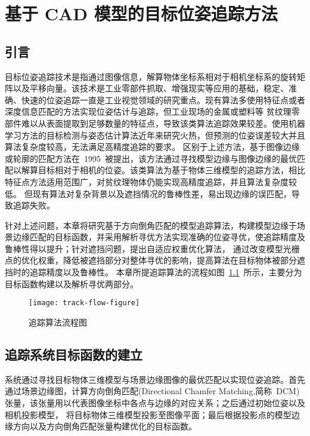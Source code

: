 \chapter{基于 CAD 模型的目标位姿追踪方法}
\label{cha:model_based_tracking}
\section{引言}
\label{sec:chapter3_intro}
目标位姿追踪技术是指通过图像信息，解算物体坐标系相对于相机坐标系的旋转矩阵以及平移向量。该技术是工业零部件抓取、增强现实等应用的基础，稳定、准确、快速的位姿追踪一直是工业视觉领域的研究重点。现有算法多使用特征点或者深度信息匹配的方法实现位姿估计与追踪，但工业现场的金属或塑料等
贫纹理零部件难以从表面提取到足够数量的特征点，导致该类算法追踪效果较差。使用机器学习方法的目标检测与姿态估计算法近年来研究火热，但预测的位姿误差较大并且算法复杂度较高，无法满足高精度追踪的要求。
区别于上述方法，基于图像边缘或轮廓的匹配方法在~1995~被提出，该方法通过寻找模型边缘与图像边缘的最优匹配以解算目标相对于相机的位姿。该类算法为基于物体三维模型的追踪方法，相比特征点方法适用范围广，对贫纹理物体仍能实现高精度追踪，并且算法复杂度较低。
但现有算法对复杂背景以及遮挡情况的鲁棒性差，易出现边缘的误匹配，导致追踪失败。

针对上述问题，本章将研究基于方向倒角匹配的模型追踪算法，构建模型边缘于场景边缘匹配的目标函数，并采用解析寻优方法实现准确的位姿寻优，使追踪精度及鲁棒性得以提升；针对遮挡问题，提出自适应权重优化算法，
通过改变模型光栅点的优化权重，降低被遮挡部分对整体寻优的影响，提高算法在目标物体被部分遮挡时的追踪精度以及鲁棒性。
本章所提追踪算法的流程如图~\ref{fig:track-flow-figure}~所示，主要分为目标函数构建以及解析寻优两部分。
\begin{figure}[b]
    \centering
  \texttt{[image: track-flow-figure]}
    \caption{追踪算法流程图}
    \label{fig:track-flow-figure}
  \end{figure}

\section{追踪系统目标函数的建立}
\label{sec:Objective function}
系统通过寻找目标物体三维模型与场景边缘图像的最优匹配以实现位姿追踪。首先通过场景边缘图，计算方向倒角匹配(Directional Chamfer Matching,简称~DCM)张量，该张量用以代表图像坐标中各点与边缘的对应关系；之后通过初始位姿以及相机投影模型，
将目标物体三维模型投影至图像平面；最后根据投影点的模型边缘方向以及方向倒角匹配张量构建优化的目标函数。

